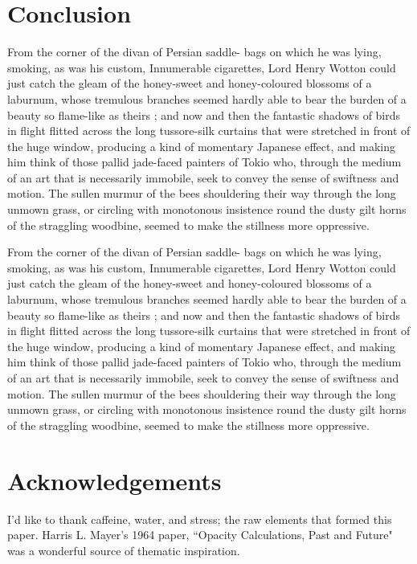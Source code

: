 \documentclass{sig-alternate}
\begin{document}
\section{Conclusion}
\label{conclusion}
From the corner of the divan of Persian saddle- 
bags on which he was lying, smoking, as was his 
custom, Innumerable cigarettes, Lord Henry Wotton 
could just catch the gleam of the honey-sweet and 
honey-coloured blossoms of a laburnum, whose 
tremulous branches seemed hardly able to bear the 
burden of a beauty so flame-like as theirs ; and 
now and then the fantastic shadows of birds in 
flight flitted across the long tussore-silk curtains 
that were stretched in front of the huge window, 
producing a kind of momentary Japanese effect, 
and making him think of those pallid jade-faced 
painters of Tokio who, through the medium of an 
art that is necessarily immobile, seek to convey the 
sense of swiftness and motion. The sullen murmur 
of the bees shouldering their way through the long 
unmown grass, or circling with monotonous insistence 
round the dusty gilt horns of the straggling woodbine, 
seemed to make the stillness more oppressive.

From the corner of the divan of Persian saddle- 
bags on which he was lying, smoking, as was his 
custom, Innumerable cigarettes, Lord Henry Wotton 
could just catch the gleam of the honey-sweet and 
honey-coloured blossoms of a laburnum, whose 
tremulous branches seemed hardly able to bear the 
burden of a beauty so flame-like as theirs ; and 
now and then the fantastic shadows of birds in 
flight flitted across the long tussore-silk curtains 
that were stretched in front of the huge window, 
producing a kind of momentary Japanese effect, 
and making him think of those pallid jade-faced 
painters of Tokio who, through the medium of an 
art that is necessarily immobile, seek to convey the 
sense of swiftness and motion. The sullen murmur 
of the bees shouldering their way through the long 
unmown grass, or circling with monotonous insistence 
round the dusty gilt horns of the straggling woodbine, 
seemed to make the stillness more oppressive.

\section{Acknowledgements}
I'd like to thank caffeine, water, and stress; the raw elements that formed this paper. Harris L. Mayer's 1964 paper, ``Opacity Calculations, Past and Future" was a wonderful source of thematic inspiration.

  

\end{document}
